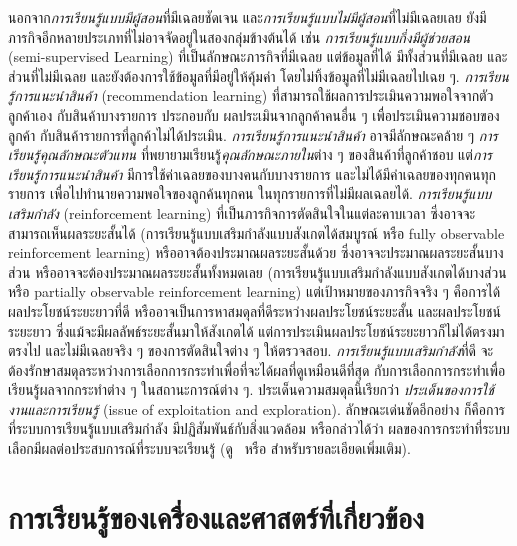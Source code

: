 นอกจาก\textit{การเรียนรู้แบบมีผู้สอน}ที่มีเฉลยชัดเจน
และ\textit{การเรียนรู้แบบไม่มีผู้สอน}ที่ไม่มีเฉลยเลย
ยังมีภารกิจอีกหลายประเภทที่ไม่อาจจัดอยู่ในสองกลุ่มข้างต้นได้
เช่น 
\textit{การเรียนรู้แบบกึ่งมีผู้ช่วยสอน} (semi-supervised Learning) ที่เป็นลักษณะภารกิจที่มีเฉลย แต่ข้อมูลที่ได้ มีทั้งส่วนที่มีเฉลย
และส่วนที่ไม่มีเฉลย และยังต้องการใช้ข้อมูลที่มีอยู่ให้คุ้มค่า โดยไม่ทิ้งข้อมูลที่ไม่มีเฉลยไปเฉย ๆ.
\textit{การเรียนรู้การแนะนำสินค้า} (recommendation learning\cite{Recommender2011, CollaborativeFiltering2009})
ที่สามารถใช้ผลการประเมินความพอใจจากตัวลูกค้าเอง กับสินค้าบางรายการ ประกอบกับ ผลประเมินจากลูกค้าคนอื่น ๆ เพื่อประเมินความชอบของลูกค้า กับสินค้ารายการที่ลูกค้าไม่ได้ประเมิน.
\textit{การเรียนรู้การแนะนำสินค้า} อาจมีลักษณะคล้าย ๆ \textit{การเรียนรู้คุณลักษณะตัวแทน} 
ที่พยายามเรียนรู้\textit{คุณลักษณะภายใน}ต่าง ๆ ของสินค้าที่ลูกค้าชอบ
แต่\textit{การเรียนรู้การแนะนำสินค้า}
มีการใช้ค่าเฉลยของบางคนกับบางรายการ และไม่ได้มีค่าเฉลยของทุกคนทุกรายการ
เพื่อไปทำนายความพอใจของลูกค้นทุกคน ในทุกรายการที่ไม่มีผลเฉลยได้.
\textit{การเรียนรู้แบบเสริมกำลัง} (reinforcement learning)
ที่เป็นภารกิจการตัดสินใจในแต่ละคาบเวลา ซึ่งอาจจะสามารถเห็นผลระยะสั้นได้ (การเรียนรู้แบบเสริมกำลังแบบสังเกตได้สมบูรณ์ หรือ fully observable reinforcement learning) หรืออาจต้องประมาณผลระยะสั้นด้วย
ซึ่งอาจจะประมาณผลระยะสั้นบางส่วน
หรืออาจจะต้องประมาณผลระยะสั้นทั้งหมดเลย (การเรียนรู้แบบเสริมกำลังแบบสังเกตได้บางส่วน หรือ partially observable reinforcement learning)
แต่เป้าหมายของภารกิจจริง ๆ คือการได้ผลประโยชน์ระยะยาวที่ดี
หรืออาจเป็นการหาสมดุลที่ดีระหว่างผลประโยชน์ระยะสั้น และผลประโยชน์ระยะยาว ซึ่งแม้จะมีผลลัพธ์ระยะสั้นมาให้สังเกตได้ 
แต่การประเมินผลประโยชน์ระยะยาวก็ไม่ได้ตรงมาตรงไป และไม่มีเฉลยจริง ๆ ของการตัดสินใจต่าง ๆ ให้ตรวจสอบ.
\textit{การเรียนรู้แบบเสริมกำลัง}ที่ดี จะต้องรักษาสมดุลระหว่างการเลือกการกระทำเพื่อที่จะได้ผลที่ดูเหมือนดีที่สุด กับการเลือกการกระทำเพื่อเรียนรู้ผลจากกระทำต่าง ๆ ในสถานะการณ์ต่าง ๆ.
ประเด็นความสมดุลนี้เรียกว่า \textit{ประเด็นของการใช้งานและการเรียนรู้} (issue of exploitation and exploration).
ลักษณะเด่นชัดอีกอย่าง ก็คือการที่ระบบการเรียนรู้แบบเสริมกำลัง มีปฏิสัมพันธ์กับสิ่งแวดล้อม หรือกล่าวได้ว่า ผลของการกระทำที่ระบบเลือกมีผลต่อประสบการณ์ที่ระบบจะเรียนรู้ (ดู~\cite{KatanyukulEtAl2011a} หรือ \cite{SuttonBarto1998a} สำหรับรายละเอียดเพิ่มเติม).



\section{การเรียนรู้ของเครื่องและศาสตร์ที่เกี่ยวข้อง}

